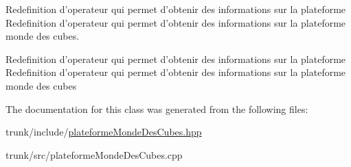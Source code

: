 Redefinition d'operateur qui permet d'obtenir des informations sur la plateforme Redefinition d'operateur qui permet d'obtenir des informations sur la plateforme monde des cubes. 

Redefinition d'operateur qui permet d'obtenir des informations sur la plateforme Redefinition d'operateur qui permet d'obtenir des informations sur la plateforme monde des cubes 

The documentation for this class was generated from the following files:\begin{CompactItemize}
\item 
trunk/include/\hyperlink{plateformeMondeDesCubes_8hpp}{plateformeMondeDesCubes.hpp}\item 
trunk/src/plateformeMondeDesCubes.cpp\end{CompactItemize}
